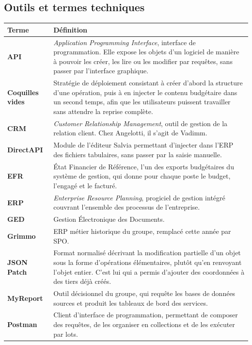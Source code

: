 \vspace{1em}
\subsection*{Outils et termes techniques}
\begin{longtable}{p{4cm} p{11cm}}
\textbf{Terme} & \textbf{Définition} \\
\hline
\endhead
\textbf{API} & \emph{Application Programming Interface}, interface de programmation. Elle expose les objets d'un logiciel de manière à pouvoir les créer, les lire ou les modifier par requêtes, sans passer par l'interface graphique. \\
\textbf{Coquilles vides} & Stratégie de déploiement consistant à créer d'abord la structure d'une opération, puis à en injecter le contenu budgétaire dans un second temps, afin que les utilisateurs puissent travailler sans attendre la reprise complète. \\
\textbf{CRM} & \emph{Customer Relationship Management}, outil de gestion de la relation client. Chez Angelotti, il s'agit de Vadimm. \\
\textbf{DirectAPI} & Module de l'éditeur Salvia permettant d'injecter dans l'ERP des fichiers tabulaires, sans passer par la saisie manuelle. \\
\textbf{EFR} & État Financier de Référence, l'un des exports budgétaires du système de gestion, qui donne pour chaque poste le budget, l'engagé et le facturé. \\
\textbf{ERP} & \emph{Enterprise Resource Planning}, progiciel de gestion intégré couvrant l'ensemble des processus de l'entreprise. \\
\textbf{GED} & Gestion Électronique des Documents. \\
\textbf{Grimmo} & ERP métier historique du groupe, remplacé cette année par SPO. \\
\textbf{JSON Patch} & Format normalisé décrivant la modification partielle d'un objet sous la forme d'opérations élémentaires, plutôt qu'en renvoyant l'objet entier. C'est lui qui a permis d'ajouter des coordonnées à des tiers déjà créés. \\
\textbf{MyReport} & Outil décisionnel du groupe, qui requête les bases de données sources et produit les tableaux de bord des services. \\
\textbf{Postman} & Client d'interface de programmation, permettant de composer des requêtes, de les organiser en collections et de les exécuter par lots. \\

\end{longtable}
